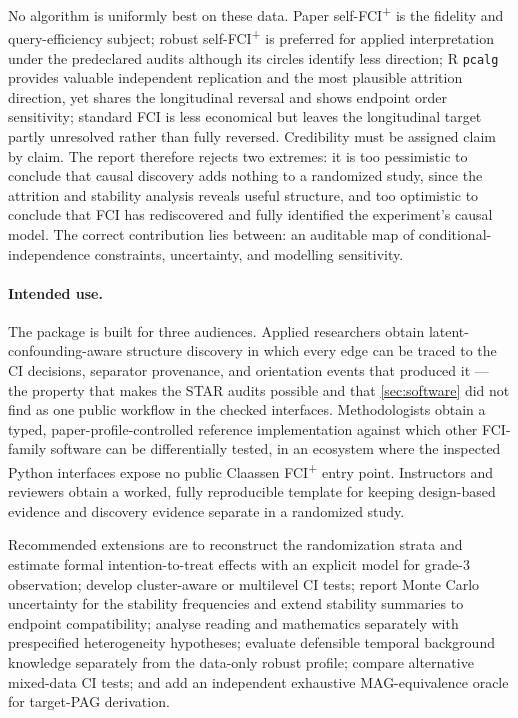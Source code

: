 \documentclass[11pt,a4paper]{article}
\newcommand{\FCIplus}{FCI\textsuperscript{+}}
\newcommand{\code}[1]{\texttt{#1}}
\begin{document}
No algorithm is uniformly best on these data. Paper self-\FCIplus{} is the
fidelity and query-efficiency subject; robust self-\FCIplus{} is preferred for
applied interpretation under the predeclared audits although its circles
identify less direction; R \code{pcalg} provides valuable independent
replication and the most plausible attrition direction, yet shares the
longitudinal reversal and shows endpoint order sensitivity; standard FCI is less
economical but leaves the longitudinal target partly unresolved rather than
fully reversed. Credibility must be assigned claim by claim. The report
therefore rejects two extremes: it is too pessimistic to conclude that causal
discovery adds nothing to a randomized study, since the attrition and stability
analysis reveals useful structure, and too optimistic to conclude that FCI has
rediscovered and fully identified the experiment's causal model. The correct
contribution lies between: an auditable map of conditional-independence
constraints, uncertainty, and modelling sensitivity.

\paragraph{Intended use.} The package is built for three audiences. Applied
researchers obtain latent-confounding-aware structure discovery in which every
edge can be traced to the CI decisions, separator provenance, and orientation
events that produced it --- the property that makes the STAR audits possible
and that \cref{sec:software} did not find as one public workflow in the
checked interfaces. Methodologists obtain a typed, paper-profile-controlled
reference implementation against which other FCI-family software can be
differentially tested, in an ecosystem where the inspected Python interfaces
expose no public Claassen \FCIplus{} entry point. Instructors and reviewers
obtain a worked, fully reproducible template for keeping design-based evidence
and discovery evidence separate in a randomized study.

Recommended extensions are to reconstruct the randomization strata and estimate
formal intention-to-treat effects with an explicit model for grade-3
observation; develop cluster-aware or multilevel CI tests; report Monte Carlo
uncertainty for the stability frequencies and extend stability summaries to
endpoint compatibility; analyse reading and mathematics separately with
prespecified heterogeneity hypotheses; evaluate defensible temporal background
knowledge separately from the data-only robust profile; compare alternative
mixed-data CI tests; and add an independent exhaustive MAG-equivalence oracle
for target-PAG derivation.
\end{document}
